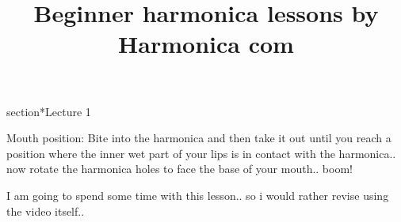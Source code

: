 \documentclass{article}
\title{Beginner harmonica lessons by Harmonica com}
\begin{document}
\maketitle

section*{Lecture 1}

Mouth position: Bite into the harmonica and then take it out until
you reach a position where the inner wet part of your lips is in
contact with the harmonica.. now rotate the harmonica holes to face the 
base of your mouth.. boom!

I am going to spend some time with this lesson.. so i would rather 
revise using the video itself..
\end{document}
